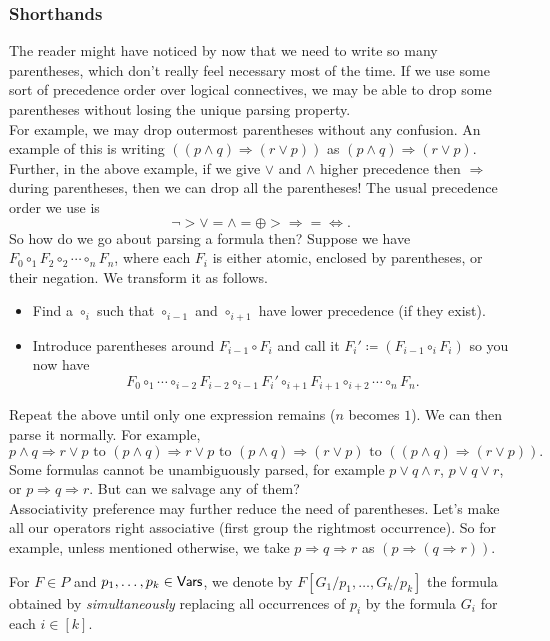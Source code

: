 \subsubsection{Shorthands}

The reader might have noticed by now that we need to write so many parentheses, which don't really feel necessary most of the time. If we use some sort of precedence order over logical connectives, we may be able to drop some parentheses without losing the unique parsing property.\\
For example, we may drop outermost parentheses without any confusion. An example of this is writing $((p \wedge q)\Rightarrow (r \vee p))$ as $(p \wedge q)\Rightarrow (r \vee p)$.\\
Further, in the above example, if we give $\vee$ and $\wedge$ higher precedence then $\Rightarrow$ during parentheses, then we can drop all the parentheses! The usual precedence order we use is
\[ \neg > \vee = \wedge = \oplus > \Rightarrow = \iff. \]
So how do we go about parsing a formula then? Suppose we have $F_0\circ_1 F_2\circ_2 \cdots\circ_n F_n$, where each $F_i$ is either atomic, enclosed by parentheses, or their negation. We transform it as follows.
\begin{itemize}
    \item Find a $\circ_i$ such that $\circ_{i-1}$ and $\circ_{i+1}$ have lower precedence (if they exist).
    \item Introduce parentheses around $F_{i-1}\circ F_i$ and call it $F_i'\coloneqq (F_{i-1}\circ_i F_i)$ so you now have
    \[ F_0 \circ_1 \cdots \circ_{i-2} F_{i-2} \circ_{i-1} F_i' \circ_{i+1} F_{i+1} \circ_{i+2} \cdots \circ_n F_n. \]
\end{itemize}
Repeat the above until only one expression remains ($n$ becomes $1$). We can then parse it normally. For example,
\[ p \wedge q \Rightarrow r \vee p \text{ to } (p\wedge q)\Rightarrow r\vee p \text{ to } (p\wedge q)\Rightarrow (r\vee p) \text{ to } ((p\wedge q)\Rightarrow (r\vee p)). \]
Some formulas cannot be unambiguously parsed, for example $p\vee q\wedge r$, $p \vee q \vee r$, or $p\Rightarrow q\Rightarrow r$. But can we salvage any of them?\\
Associativity preference may further reduce the need of parentheses. Let's make all our operators right associative (first group the rightmost occurrence). So for example, unless mentioned otherwise, we take $p\Rightarrow q\Rightarrow r$ as $(p\Rightarrow (q\Rightarrow r))$.

\begin{definition}
For $F\in P$ and $p_1,\ldots,p_k\in\mathsf{Vars}$, we denote by $F[G_1/p_1,\ldots,G_k/p_k]$ the formula obtained by \textit{simultaneously} replacing all occurrences of $p_i$ by the formula $G_i$ for each $i\in[k]$. 
\end{definition}

